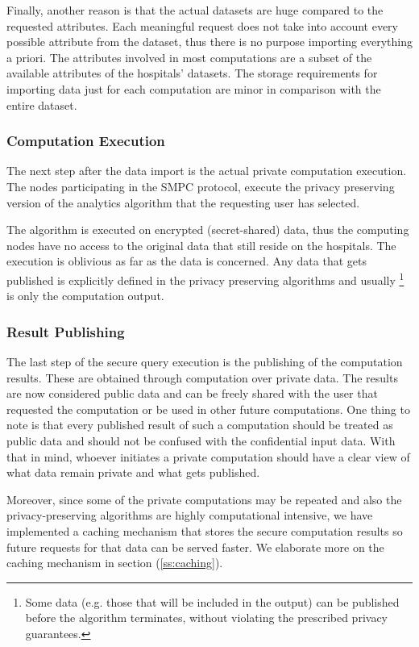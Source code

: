 Finally, another reason is that the actual datasets are huge compared to the requested attributes.
Each meaningful request does not take into account every possible attribute from the dataset, thus there is no purpose importing everything a priori.
The attributes involved in most computations are a subset of the available attributes of the hospitals' datasets.
The storage requirements for importing data just for each computation are minor in comparison with the entire dataset.


\subsubsection{Computation Execution}\label{sss:computation-execution}
The next step after the data import is the actual private computation execution.
The nodes participating in the SMPC protocol, execute the privacy preserving version of the analytics algorithm that the requesting user has selected.

The algorithm is executed on encrypted (secret\hyp shared) data, thus the computing nodes have no access to the original data that still reside on the hospitals.
The execution is oblivious as far as the data is concerned.
Any data that gets published is explicitly defined in the privacy preserving algorithms and usually \footnote{Some data (e.g. those that will be included in the output) can be published before the algorithm terminates, without violating the prescribed privacy guarantees.} is only the computation output.

\subsubsection{Result Publishing}\label{sss:result-publishing}
The last step of the secure query execution is the publishing of the computation results.
These are obtained through computation over private data.
The results are now considered public data and can be freely shared with the user that requested the computation or be used in other future computations.
One thing to note is that every published result of such a computation should be treated as public data and should not be confused with the confidential input data.
With that in mind, whoever initiates a private computation should have a clear view of what data remain private and what gets published.

Moreover, since some of the private computations may be repeated and also the privacy\hyp preserving algorithms are highly computational intensive, we have implemented a caching mechanism that stores the secure computation results so future requests for that data can be served faster.
We elaborate more on the caching mechanism in section (\ref{ss:caching}).


